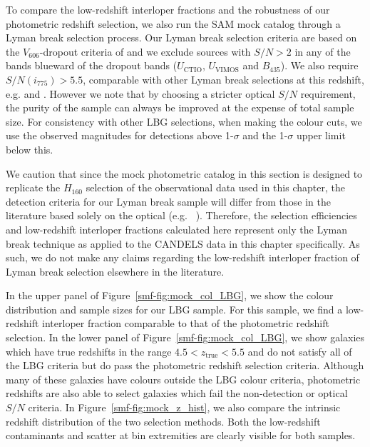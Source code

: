 To compare the low-redshift interloper fractions and the robustness of our photometric redshift selection, we also run the SAM mock catalog through a Lyman break selection process. Our Lyman break selection criteria are based on the $V_{606}$-dropout criteria of \citet{2012ApJ...754...83B} and we exclude sources with $S/N > 2$ in any of the bands blueward of the dropout bands ($U_{\text{CTIO}}$, $U_{\text{VIMOS}}$ and $B_{435}$). We also require $S/N(i_{775}) > 5.5$, comparable with other Lyman break selections at this redshift, e.g. \citet{Giavalisco:2004et} and \citet{2006AJ....132.1729B}. However we note that by choosing a stricter optical $S/N$ requirement, the purity of the sample can always be improved at the expense of total sample size. For consistency with other LBG selections, when making the colour cuts, we use the observed magnitudes for detections above 1-$\sigma$ and the 1-$\sigma$ upper limit below this.

We caution that since the mock photometric catalog in this section is designed to replicate the $H_{160}$ selection of the observational data used in this chapter, the detection criteria for our Lyman break sample will differ from those in the literature based solely on the optical (e.g. \citeauthor{2007ApJ...670..928B}~\citeyear{2007ApJ...670..928B}). Therefore, the selection efficiencies and low-redshift interloper fractions calculated here represent only the Lyman break technique as applied to the CANDELS data in this chapter specifically. As such, we do not make any claims regarding the low-redshift interloper fraction of Lyman break selection elsewhere in the literature.

In the upper panel of Figure~\ref{smf-fig:mock_col_LBG}, we show the colour distribution and sample sizes for our LBG sample. For this sample, we find a low-redshift interloper fraction comparable to that of the photometric redshift selection. In the lower panel of Figure~\ref{smf-fig:mock_col_LBG}, we show galaxies which have true redshifts in the range $4.5 < z_{\text{true}} < 5.5$ and do not satisfy all of the LBG criteria but do pass the photometric redshift selection criteria. Although many of these galaxies have colours outside the LBG colour criteria, photometric redshifts are also able to select galaxies which fail the non-detection or optical $S/N$ criteria. In Figure~\ref{smf-fig:mock_z_hist}, we also compare the intrinsic redshift distribution of the two selection methods. Both the low-redshift contaminants and scatter at bin extremities are clearly visible for both samples.

